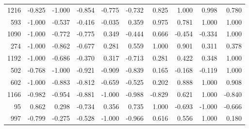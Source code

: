 \begin{longtable}{rrrrrrrrrr}
  1216 & -0.825 & -1.000 & -0.854 & -0.775 & -0.732 &  0.825 &  1.000 &  0.998 &  0.780 \\
   593 & -1.000 & -0.537 & -0.416 & -0.035 &  0.359 &  0.975 &  0.781 &  1.000 &  1.000 \\
  1090 & -1.000 & -0.772 & -0.775 &  0.349 & -0.444 &  0.666 & -0.454 & -0.334 &  1.000 \\
   274 & -1.000 & -0.862 & -0.677 &  0.281 &  0.559 &  1.000 &  0.901 &  0.311 &  0.378 \\
  1192 & -1.000 & -0.686 & -0.370 &  0.317 & -0.713 &  0.281 &  0.422 &  0.348 &  1.000 \\
   502 & -0.768 & -1.000 & -0.921 & -0.909 & -0.839 &  0.165 & -0.168 & -0.119 &  1.000 \\
   602 & -1.000 & -0.883 & -0.812 & -0.659 & -0.525 &  0.202 &  0.888 &  1.000 &  0.908 \\
  1166 & -0.982 & -0.954 & -0.881 & -1.000 & -0.988 & -0.829 &  0.621 &  1.000 & -0.840 \\
    95 &  0.862 &  0.298 & -0.734 &  0.356 &  0.735 &  1.000 & -0.693 & -1.000 & -0.666 \\
   997 & -0.799 & -0.275 & -0.528 & -1.000 & -0.966 &  0.616 &  0.556 &  1.000 &  0.180 \\
\end{longtable}

